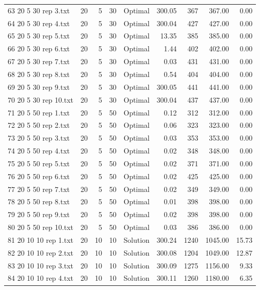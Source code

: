 \begin{longtable}{lrrllrrrr}
63 20 5 30 rep 3.txt & 20 & 5 & 30 & Optimal & 300.05 & 367 & 367.00 &  0.00\\
64 20 5 30 rep 4.txt & 20 & 5 & 30 & Optimal & 300.04 & 427 & 427.00 &  0.00\\
65 20 5 30 rep 5.txt & 20 & 5 & 30 & Optimal & 13.35 & 385 & 385.00 &  0.00\\
66 20 5 30 rep 6.txt & 20 & 5 & 30 & Optimal &  1.44 & 402 & 402.00 &  0.00\\
67 20 5 30 rep 7.txt & 20 & 5 & 30 & Optimal &  0.03 & 431 & 431.00 &  0.00\\
68 20 5 30 rep 8.txt & 20 & 5 & 30 & Optimal &  0.54 & 404 & 404.00 &  0.00\\
69 20 5 30 rep 9.txt & 20 & 5 & 30 & Optimal & 300.05 & 441 & 441.00 &  0.00\\
70 20 5 30 rep 10.txt & 20 & 5 & 30 & Optimal & 300.04 & 437 & 437.00 &  0.00\\
71 20 5 50 rep 1.txt & 20 & 5 & 50 & Optimal &  0.12 & 312 & 312.00 &  0.00\\
72 20 5 50 rep 2.txt & 20 & 5 & 50 & Optimal &  0.06 & 323 & 323.00 &  0.00\\
73 20 5 50 rep 3.txt & 20 & 5 & 50 & Optimal &  0.03 & 353 & 353.00 &  0.00\\
74 20 5 50 rep 4.txt & 20 & 5 & 50 & Optimal &  0.02 & 348 & 348.00 &  0.00\\
75 20 5 50 rep 5.txt & 20 & 5 & 50 & Optimal &  0.02 & 371 & 371.00 &  0.00\\
76 20 5 50 rep 6.txt & 20 & 5 & 50 & Optimal &  0.02 & 425 & 425.00 &  0.00\\
77 20 5 50 rep 7.txt & 20 & 5 & 50 & Optimal &  0.02 & 349 & 349.00 &  0.00\\
78 20 5 50 rep 8.txt & 20 & 5 & 50 & Optimal &  0.01 & 398 & 398.00 &  0.00\\
79 20 5 50 rep 9.txt & 20 & 5 & 50 & Optimal &  0.02 & 398 & 398.00 &  0.00\\
80 20 5 50 rep 10.txt & 20 & 5 & 50 & Optimal &  0.03 & 386 & 386.00 &  0.00\\
81 20 10 10 rep 1.txt & 20 & 10 & 10 & Solution & 300.24 & 1240 & 1045.00 & 15.73\\
82 20 10 10 rep 2.txt & 20 & 10 & 10 & Solution & 300.08 & 1204 & 1049.00 & 12.87\\
83 20 10 10 rep 3.txt & 20 & 10 & 10 & Solution & 300.09 & 1275 & 1156.00 &  9.33\\
84 20 10 10 rep 4.txt & 20 & 10 & 10 & Solution & 300.11 & 1260 & 1180.00 &  6.35\\

\end{longtable}
